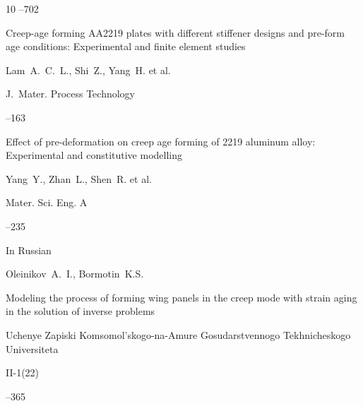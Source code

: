 \begin{thebibliography}{10}
--702   







\paper Creep-age forming AA2219 plates with different stiffener designs and pre-form age conditions: Experimental and finite element studies

\by Lam~A.~C.~L., Shi~Z., Yang~H. et al.

\jour J.~Mater. Process Technology


--163   









\paper Effect of pre-deformation on creep age forming of 2219 aluminum alloy: Experimental and constitutive modelling

\by Yang~Y., Zhan~L., Shen~R. et al.

\jour Mater. Sci. Eng. A


--235 











\lang In Russian

\by Oleinikov~A.~I., Bormotin~K.S.

\paper Modeling the process of forming wing panels in the creep mode with strain aging in the solution of inverse problems

\jour Uchenye Zapiski Komsomol'skogo-na-Amure Gosudarstvennogo Tekhnicheskogo Universiteta


\issue II-1(22)

--365






\end{thebibliography}
